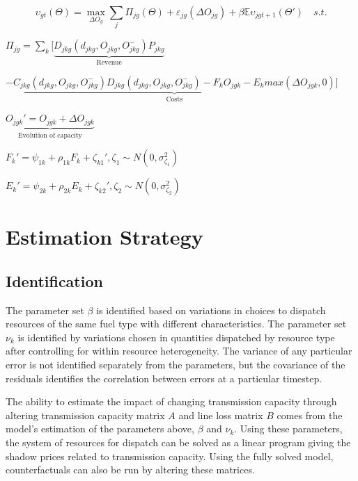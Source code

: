 \documentclass[12pt]{article}
\begin{document}
 \begin{equation}\label{LongTermModel}
     \upsilon_{gt}(\Theta)=\max_{{\Delta O_{g}}} \sum_j \Pi_{jg}(\Theta)+\varepsilon_{jg}(\Delta O_{jg})+\beta  \mathbb{E}\upsilon_{jgt+1}(\Theta') \mspace{18mu} s.t.
\end{equation}
\begin{center}
$\Pi_{jg}=\sum_{k} [\underbrace{D_{jkg}(d_{jkg},O_{jkg},O_{jkg}^-)P_{jkg}}_\text{Revenue}$
 \end{center}
\begin{center}
    $-\underbrace{C_{jkg}(d_{jkg},O_{jkg},O_{jkg}^-)D_{jkg}(d_{jkg},O_{jkg},O_{jkg}^-)-F_{k} O_{jgk}-E_{k}max(\Delta O_{jgk},0)}_\text{Costs}]$
\end{center}
 \begin{center}
     $\underbrace{O_{jgk}'=O_{jgk}+\Delta O_{jgk}}_\text{Evolution of capacity}$
 \end{center}
 \begin{center}
     $F_{k}'=\psi_{1k}+\rho_{1k}F_{k}+\zeta_{k1}', \zeta_1 \sim N(0,\sigma^2_{\zeta_1})$
 \end{center}
 \begin{center}
     $E_{k}'=\psi_{2k}+\rho_{2k}E_{k}+\zeta_{k2}', \zeta_2 \sim N(0,\sigma^2_{\zeta_2})$
 \end{center}


\section{Estimation Strategy} \label{sec:Estimation}

\subsection{Identification}

The parameter set $\beta$ is identified based on variations in choices to dispatch resources of the same fuel type with different characteristics. The parameter set $\nu_k$ is identified by variations chosen in quantities dispatched by resource type after controlling for within resource heterogeneity. The variance of any particular error is not identified separately from the parameters, but the covariance of the residuals identifies the correlation between errors at a particular timestep. 

The ability to estimate the impact of changing transmission capacity through altering transmission capacity matrix $A$ and line loss matrix $B$ comes from the model's estimation of the parameters above, $\beta$ and $\nu_k$. Using these parameters, the system of resources for dispatch can be solved as a linear program giving the shadow prices related to transmission capacity. Using the fully solved model, counterfactuals can also be run by altering these matrices.
\end{document}
